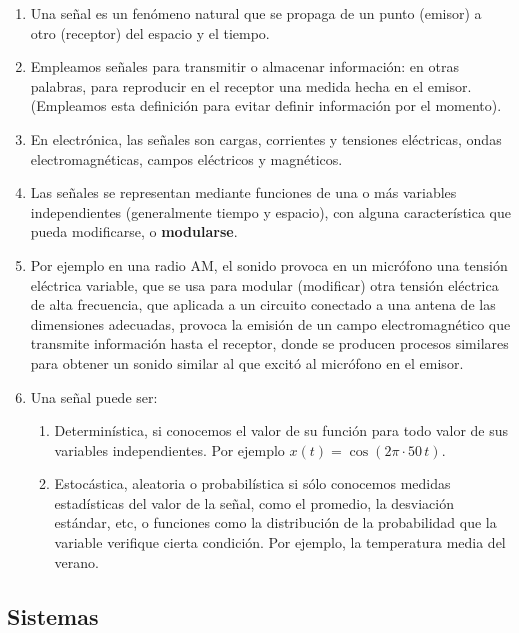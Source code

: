 \documentclass[11pt,a4paper,openany]{book}
\begin{document}
\begin{enumerate}
	
	\item Una señal es un fenómeno natural que se propaga de un punto (emisor) a otro (receptor) del espacio y el tiempo.
	\item Empleamos señales para transmitir o almacenar información: en otras palabras, para reproducir en el receptor una medida hecha en el emisor. (Empleamos esta definición para evitar definir información por el momento).
	\item En electrónica, las señales son cargas, corrientes y tensiones eléctricas, ondas electromagnéticas, campos eléctricos y magnéticos.
	\item Las señales se representan mediante funciones de una o más variables independientes (generalmente tiempo y espacio), con alguna característica que pueda modificarse, o \textbf{modularse}.
	\item Por ejemplo en una radio AM, el sonido provoca en un micrófono una tensión eléctrica variable, que se usa para modular (modificar) otra tensión eléctrica de alta frecuencia, que aplicada a un circuito conectado a una antena de las dimensiones adecuadas, provoca la emisión de un campo electromagnético que transmite información hasta el receptor, donde se producen procesos similares para obtener un sonido similar al que excitó al micrófono en el emisor.


\item Una señal puede ser:
\begin{enumerate}
	\item Determinística, si conocemos el valor de su función para todo valor de sus variables independientes. Por ejemplo $x(t) = \cos(2 \pi \cdot 50 \, t)$.
	\item Estocástica, aleatoria o probabilística si sólo conocemos medidas estadísticas del valor de la señal, como el promedio, la desviación estándar, etc, o funciones como la distribución de la probabilidad que la variable verifique cierta condición. Por ejemplo, la temperatura media del verano.
\end{enumerate}

\end{enumerate}
	
\subsection{Sistemas}
\end{document}
